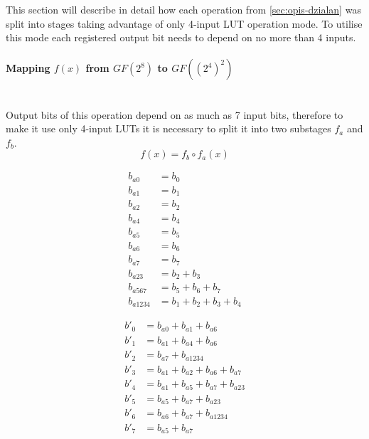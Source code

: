 This section will describe in detail how each operation from \ref{sec:opis-dzialan} was split into stages taking advantage of only 4-input LUT operation mode. To utilise this mode each registered output bit needs to depend on no more than 4 inputs.



\paragraph{Mapping $f(x)$ from $GF(2^8)$ to $GF((2^4)^2)$}\mbox{}\\
Output bits of this operation depend on as much as 7 input bits, therefore to make it use only 4-input LUTs it is necessary to split it into two substages $f_a$ and $f_b$.
\begin{equation}
f(x) = f_b \circ f_a(x)
\end{equation}

\begin{equation}
\label{eq:mul_delta_a}
\begin{aligned}
b_{a0}    &= b_0                    \\
b_{a1}    &= b_1                    \\
b_{a2}    &= b_2                    \\
b_{a4}    &= b_4                    \\
b_{a5}    &= b_5                    \\
b_{a6}    &= b_6                    \\
b_{a7}    &= b_7                    \\
b_{a23}   &= b_2 + b_3              \\
b_{a567}  &= b_5 + b_6 + b_7        \\
b_{a1234} &= b_1 + b_2 + b_3 + b_4
\end{aligned}
\end{equation}

\begin{equation}
\label{eq:mul_delta_b}
\begin{aligned}
b'_0 &= b_{a0} + b_{a1} + b_{a6}           \\
b'_1 &= b_{a1} + b_{a4} + b_{a6}           \\
b'_2 &= b_{a7} + b_{a1234}                 \\
b'_3 &= b_{a1} + b_{a2} + b_{a6} + b_{a7}  \\
b'_4 &= b_{a1} + b_{a5} + b_{a7} + b_{a23} \\
b'_5 &= b_{a5} + b_{a7} + b_{a23}          \\
b'_6 &= b_{a6} + b_{a7} + b_{a1234}        \\
b'_7 &= b_{a5} + b_{a7}                    
\end{aligned}
\end{equation}

